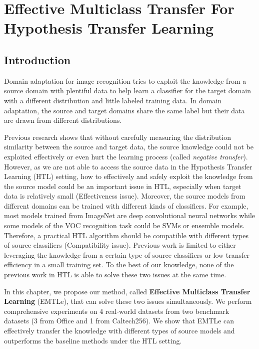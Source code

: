 \chapter{Effective Multiclass Transfer For Hypothesis Transfer Learning}\label{sec:pakdd}
\section{Introduction}
Domain adaptation for image recognition tries to exploit the knowledge from a source domain with plentiful data to help learn a classifier for the target domain with a different distribution and little labeled training data. In domain adaptation, the source and target domains share the same label but their data are drawn from different distributions.

Previous research \cite{ben2010theory,ben2007analysis} shows that without carefully measuring the distribution similarity between the source and target data, the source knowledge could not be exploited effectively or even hurt the learning process (called  \textit{negative transfer})\cite{pan2010survey}. 
However, as we are not able to access the source data in the Hypothesis Transfer Learning (HTL) \cite{kuzborskij2013stability} setting, how to effectively and safely exploit the knowledge from the source model could be an important issue in HTL, especially when target data is relatively small (Effectiveness issue). Moreover, the source models from different domains can be trained with different kinds of classifiers. For example, most models trained from ImageNet are deep convolutional neural networks while some models of the VOC recognition task could be SVMs or ensemble models. Therefore, a practical HTL algorithm should be compatible with different types of source classifiers (Compatibility issue). Previous work is limited to either leveraging the knowledge from a certain type of source classifiers \cite{tommasi2014learning,fei2006one} or low transfer efficiency in a small training set\cite{jie2011multiclass}. To the best of our knowledge, none of the previous work in HTL is able to solve these two issues at the same time.

In this chapter, we propose our method, called \textbf{Effective Multiclass Transfer Learning} (EMTLe), that can solve these two issues simultaneously. We perform comprehensive experiments on 4 real-world datasets from two benchmark datasets (3 from Office and 1 from Caltech256). We show that EMTLe can effectively transfer the knowledge with different types of source models and outperforms the baseline methods under the HTL setting. 

